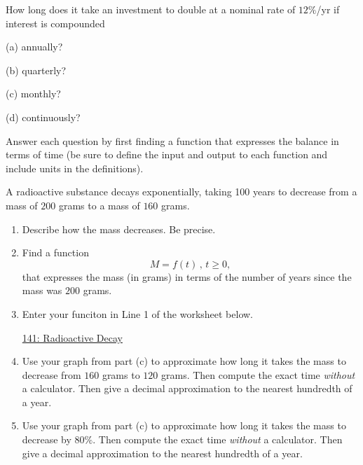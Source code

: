 \documentclass{ximera}
\begin{document}
\begin{question}  \label{Q:DLDFLLLLL}
How long does it take an investment to double at a nominal rate of $12\%$/yr if interest is compounded

(a) annually?

(b) quarterly?

(c) monthly?

(d) continuously?

Answer each question by first finding a function that expresses the balance in terms of time (be sure to define the input and output to each function and include units in the definitions).

\end{question}


\begin{question}  \label{Q:dfbhhhhh}
A radioactive substance decays exponentially, taking 100 years to decrease from a mass of $200$ grams to a mass of $160$ grams.

\begin{enumerate}
\item Describe how the mass decreases. Be precise.

\item  Find a function 
\[
 M= f(t) \, , \, t\geq 0 ,
\]
that expresses the mass (in grams) in terms of the number of years since the mass was $200$ grams.

\item Enter your funciton in Line 1 of the worksheet below. 

\begin{onlineOnly}
    \begin{center}
\end{center}
\end{onlineOnly}


\href{https://www.desmos.com/calculator/uuh05fw3bx}{141: Radioactive Decay}



\item Use your graph from part (c) to approximate how long it takes the mass to decrease from $160$ grams to $120$ grams. Then compute the exact time \emph{without} a calculator. Then give a decimal approximation to the nearest hundredth of a year.

\item Use your graph from part (c) to approximate how long it takes the mass to decrease by $80\%$. Then compute the exact time \emph{without} a calculator. Then give a decimal approximation to the nearest hundredth of a year.


\end{enumerate}
\end{question}
\end{document}
